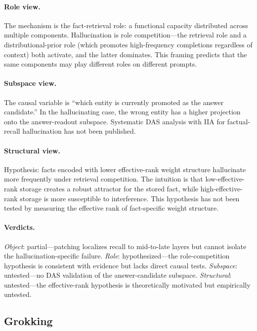 \documentclass{article}
\begin{document}
\paragraph{Role view.}
The mechanism is the fact-retrieval role: a functional capacity
distributed across multiple components. Hallucination is role
competition---the retrieval role and a distributional-prior role (which
promotes high-frequency completions regardless of context) both activate,
and the latter dominates. This framing predicts that the same components
may play different roles on different prompts.

\paragraph{Subspace view.}
The causal variable is ``which entity is currently promoted as the answer
candidate.'' In the hallucinating case, the wrong entity has a higher
projection onto the answer-readout subspace. Systematic DAS analysis with
IIA for factual-recall hallucination has not been published.

\paragraph{Structural view.}
Hypothesis: facts encoded with lower effective-rank weight structure
hallucinate more frequently under retrieval competition. The intuition
is that low-effective-rank storage creates a robust attractor for the
stored fact, while high-effective-rank storage is more susceptible to
interference. This hypothesis has not been tested by measuring the
effective rank of fact-specific weight structure.

\paragraph{Verdicts.}
\emph{Object}: partial---patching localizes recall to mid-to-late layers
but cannot isolate the hallucination-specific failure.
\emph{Role}: hypothesized---the role-competition hypothesis is consistent
with evidence but lacks direct causal tests.
\emph{Subspace}: untested---no DAS validation of the answer-candidate
subspace.
\emph{Structural}: untested---the effective-rank hypothesis is
theoretically motivated but empirically untested.


\subsection{Grokking}\label{app:cs_grokking}
\end{document}
